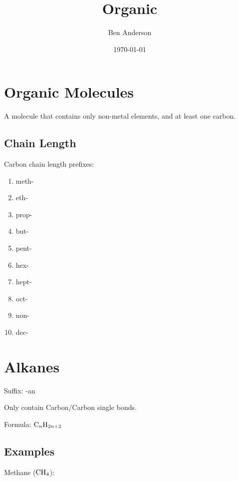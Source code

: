 \documentclass[a4paper,11pt]{article}
\begin{document}
\title{Organic}
\author{Ben Anderson}
\date{\today}
\maketitle
\pagebreak

\tableofcontents
\pagebreak


\section{Organic Molecules}

A molecule that contains only non-metal elements, and at least one carbon.

\subsection{Chain Length}

Carbon chain length prefixes:

\begin{enumerate}
\item meth-
\item eth-
\item prop-
\item but-
\item pent-
\item hex-
\item hept-
\item oct-
\item non-
\item dec-
\end{enumerate}




\section{Alkanes}

Suffix: -an

Only contain Carbon/Carbon single bonds.

Formula: $\ce{C_{n}H_{2n + 2}}$


\subsection{Examples}

Methane ($\ce{CH4}$):

\begin{center}
\end{center}
\end{document}
